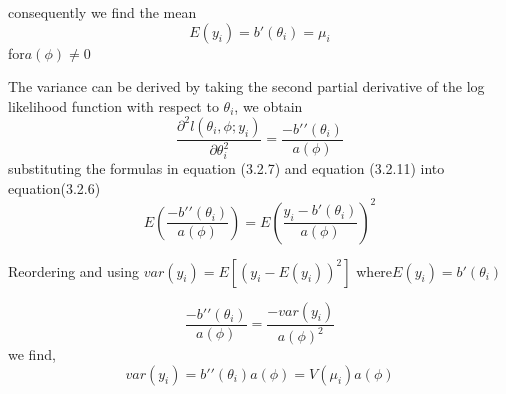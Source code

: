 \documentclass[twoside,a4paper,12pt]{article}
\begin{document}
	consequently we find the mean 
	\begin{equation}
		E(y_i) = b\prime(\theta_i)= \mu_i 
	\end{equation}
	for$ a(\phi)\ne0$
	
	
	The variance can be derived by taking the second partial derivative of the log likelihood function with respect to $\theta_i$, we obtain
	\begin{equation}
		\frac{\partial^2 l(\theta_i,\phi;y_i)}{\partial\theta_i^2}=\frac{-b\prime\prime(\theta_i)}{a(\phi)}
	\end{equation}
	substituting the formulas in equation (3.2.7) and equation (3.2.11) into equation(3.2.6)
	\begin{equation}
		E\left(\frac{-b\prime\prime(\theta_i)}{a(\phi)}\right)=E\left(\frac{y_i-b\prime(\theta_i)}{a(\phi)}\right)^2
	\end{equation}
	
	Reordering and using $var(y_i)=E[(y_i-E(y_i))^2]$ 
	where$ E(y_i)=b\prime(\theta_i)$
	
	\begin{equation}
		\frac{-b\prime\prime(\theta_i)}{a(\phi)}=\frac{-var(y_i)}{a(\phi)^2}
	\end{equation}
	we find,
	\begin{equation}
		var(y_i)=b\prime\prime(\theta_i)a(\phi)=V(\mu_i)a(\phi)
	\end{equation}
\end{document}
